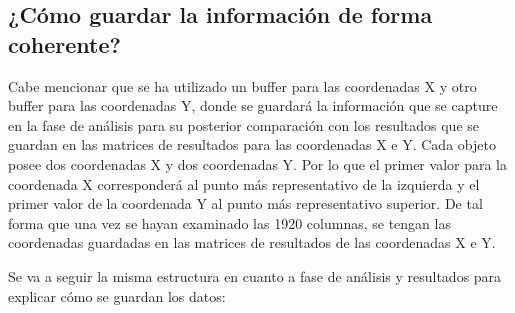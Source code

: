 \subsection{¿Cómo guardar la información de forma coherente?}

Cabe mencionar que se ha utilizado un buffer para las coordenadas X y otro buffer para las coordenadas Y, donde se guardará la información que se capture en la fase de análisis para su posterior comparación con los resultados que se guardan en las matrices de resultados para las coordenadas X e Y. Cada objeto posee dos coordenadas X y dos coordenadas Y. Por lo que el primer valor para la coordenada X corresponderá al punto más representativo de la izquierda y el primer valor de la coordenada Y al punto más representativo superior. De tal forma que una vez se hayan examinado las 1920 columnas, se tengan las coordenadas guardadas en las matrices de resultados de las coordenadas X e Y.

Se va a seguir la misma estructura en cuanto a fase de análisis y resultados para explicar cómo se guardan los datos:

